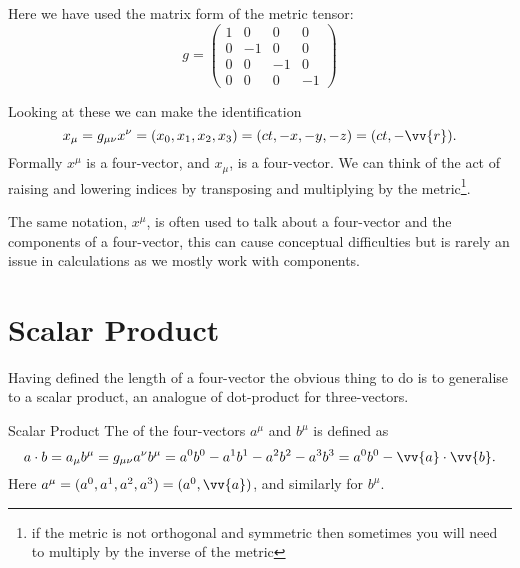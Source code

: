 \documentclass[fleqn]{NotesClass}
\begin{document}
    Here we have used the matrix form of the metric tensor:
    \begin{equation}
        g = 
        \begin{pmatrix}
            1 & 0 & 0 & 0\\
            0 & -1 & 0 & 0\\
            0 & 0 & -1 & 0\\
            0 & 0 & 0 & -1
        \end{pmatrix}
    \end{equation}
    
    Looking at these we can make the identification
    \begin{equation}
        x_\mu = g_{\mu\nu}x^\nu = (x_0, x_1, x_2, x_3) = (ct, -x, -y, -z) = (ct, -\vv{r}).
    \end{equation}
    Formally \(x^\mu\) is a  four-vector, and \(x_\mu\), is a  four-vector.
    We can think of the act of raising and lowering indices by transposing and multiplying by the metric\footnote{if the metric is not orthogonal and symmetric then sometimes you will need to multiply by the inverse of the metric}.
    
    \begin{rmk}
        The same notation, \(x^\mu\), is often used to talk about a four-vector and the components of a four-vector, this can cause conceptual difficulties but is rarely an issue in calculations as we mostly work with components.
    \end{rmk}
    
    \section{Scalar Product}
    Having defined the length of a four-vector the obvious thing to do is to generalise to a scalar product, an analogue of dot-product for three-vectors.
    \begin{dfn}{Scalar Product}{}
        The  of the four-vectors \(a^\mu\) and \(b^\mu\) is defined as
        \begin{equation}
            a\cdot b = a_\mu b^\mu = g_{\mu\nu}a^\nu b^\mu = a^0b^0 - a^1b^1 - a^2b^2 - a^3b^3 = a^0b^0 - \vv{a} \cdot \vv{b}.
        \end{equation}
        Here \(a^\mu = (a^0, a^1, a^2, a^3) = (a^0, \vv{a})\), and similarly for \(b^\mu\).
    \end{dfn}
    
\end{document}
